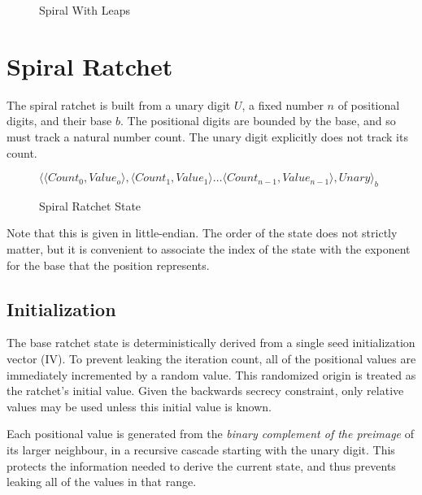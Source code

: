 \documentclass{article}
\begin{document}
	\begin{figure}[h]
		\centering
		
		
		\caption{Spiral With Leaps}
		\label{spiral-metaphor}
	\end{figure}
	
	\section{Spiral Ratchet}
	
	The spiral ratchet is built from a unary digit $U$, a fixed number $n$ of positional digits, and their base $b$. The positional digits are bounded by the base, and so must track a natural number count. The unary digit explicitly does not track its count.
	
	\begin{figure}[h]
		\centering
		
		$\langle \langle Count_{0}, Value_{o} \rangle, \langle Count_{1}, Value_{1} \rangle \ldots \langle Count_{n-1}, Value_{n-1} \rangle, Unary \rangle_{b}$
		
		\caption{Spiral Ratchet State}
	\end{figure}

	Note that this is given in little-endian. The order of the state does not strictly matter, but it is convenient to associate the index of the state with the exponent for the base that the position represents.
	
	\subsection{Initialization}
	
	The base ratchet state is deterministically derived from a single seed initialization vector (IV). To prevent leaking the iteration count, all of the positional values are immediately incremented by a random value. This randomized origin is treated as the ratchet's initial value. Given the backwards secrecy constraint, only relative values may be used unless this initial value is known.
	
	Each positional value is generated from the \emph{binary complement of the preimage} of its larger neighbour, in a recursive cascade starting with the unary digit. This protects the information needed to derive the current state, and thus prevents leaking all of the values in that range.
		
\end{document}
